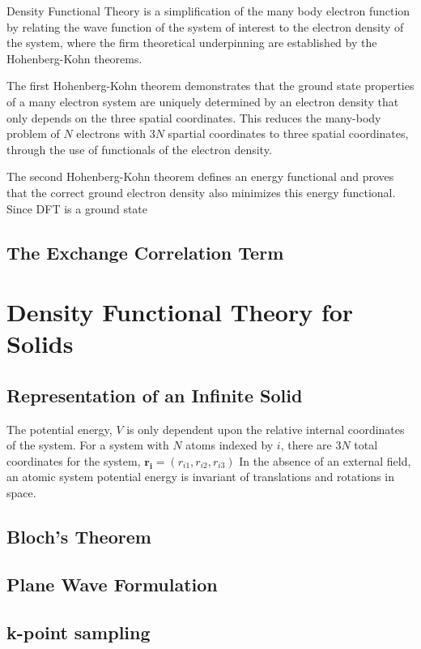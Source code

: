 Density Functional Theory is a simplification of the many body electron function by relating the wave function of the system of interest to the electron density of the system, where the firm theoretical underpinning are established by the Hohenberg-Kohn theorems\cite{hohenberg1964_dft}.

The first Hohenberg-Kohn theorem demonstrates that the ground state properties of a many electron system are uniquely determined by an electron density that only depends on the three spatial coordinates.  This reduces the many-body problem of $N$ electrons with $3N$ spartial coordinates to three spatial coordinates, through the use of functionals of the electron density.

The second Hohenberg-Kohn theorem defines an energy functional and proves that the correct ground electron density also minimizes this energy functional.  Since DFT is a ground state
\subsection{The Exchange Correlation Term}
\section{Density Functional Theory for Solids}
\subsection{Representation of an Infinite Solid}

The potential energy, $V$ is only dependent upon the relative internal coordinates of the system.
For a system with $N$ atoms indexed by $i$, there are $3N$ total coordinates for the system,
	$\bm{r_{i}}=(r_{i1},r_{i2},r_{i3})$
In the absence of an external field, an atomic system potential energy is invariant of translations and rotations in space.

\subsection{Bloch's Theorem}
\subsection{Plane Wave Formulation}
\subsection{k-point sampling}
